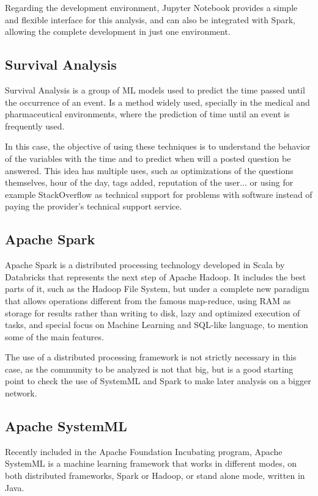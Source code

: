 \documentclass[11pt]{book} %
\begin{document}
    Regarding the development environment, Jupyter Notebook provides a simple and flexible interface for this analysis, and can also be integrated with Spark, allowing the complete development in just one environment.

  \subsection{Survival Analysis}

    Survival Analysis is a group of ML models used to predict the time passed until the occurrence of an event. Is a method widely used, specially in the medical and pharmaceutical environments, where the prediction of time until an event is frequently used.

    In this case, the objective of using these techniques is to understand the behavior of the variables with the time and to predict when will a posted question be answered. This idea has multiple uses, such as optimizations of the questions themselves, hour of the day, tags added, reputation of the user... or using for example StackOverflow as technical support for problems with software instead of paying the provider's technical support service.

  \subsection{Apache Spark}

    Apache Spark is a distributed processing technology developed in Scala by Databricks that represents the next step of Apache Hadoop. It includes the best parts of it, such as the Hadoop File System, but under a complete new paradigm that allows operations different from the famous map-reduce, using RAM as storage for results rather than writing to disk, lazy and optimized execution of tasks, and special focus on Machine Learning and SQL-like language, to mention some of the main features.

    The use of a distributed processing framework is not strictly necessary in this case, as the community to be analyzed is not that big, but is a good starting point to check the use of SystemML and Spark to make later analysis on a bigger network.

  \subsection{Apache SystemML}

    Recently included in the Apache Foundation Incubating  program, Apache SystemML is a machine learning framework that works in different modes, on both distributed frameworks, Spark or Hadoop, or stand alone mode, written in Java.
\end{document}
